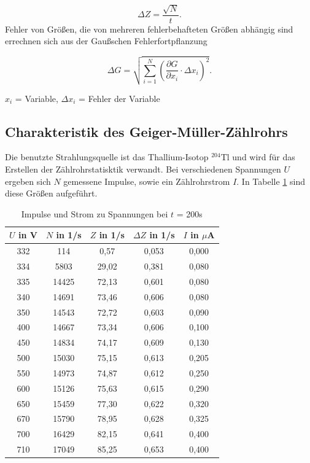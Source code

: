 \begin{equation}
 \Delta Z = \frac{\sqrt{N}}{t}.
\end{equation}
Fehler von Größen, die von mehreren fehlerbehafteten Größen abhängig sind errechnen sich aus der Gaußschen Fehlerfortpflanzung

\begin{formel}[H]
\begin{equation}
\Delta G = \sqrt{\sum_{i=1}^{N}\left( \frac{\partial G}{\partial x_i}\cdot \Delta x_i\right)^2}.
\label{eq_gauss}
\end{equation}
\caption*{\small{$x_i$ = Variable, $\Delta x_i$ = Fehler der Variable}}
\end{formel}

\subsection{Charakteristik des Geiger-Müller-Zählrohrs}
Die benutzte Strahlungsquelle ist das Thallium-Isotop $^{204}$Tl und wird für das Erstellen der Zählrohrstatisktik verwandt. Bei
verschiedenen Spannungen $U$ ergeben sich $N$ gemessene Impulse, sowie ein Zählrohrstrom $I$. In Tabelle \ref{tab_charakteristik} sind diese
Größen aufgeführt.

\begin{table}[H]
 \begin{tabular}{c|c|c|c|c}
 $U$ in V & $N$ in 1/s & $Z$ in 1/s & $\Delta Z$ in 1/s & $I$ in $\mu$A \\
 \hline
  332&	114 &0,57&	0,053&	0,000 \\
334&	5803 &29,02&	0,381&	0,080\\
335&	14425&	72,13&	0,601&	0,080\\
340&	14691&	73,46&	0,606&	0,080\\
350&	14543&	72,72&	0,603&	0,090\\
400&	14667&	73,34&	0,606&	0,100\\
450&	14834&	74,17&	0,609&	0,130\\
500&	15030&	75,15&	0,613&	0,205\\
550&	14973&	74,87&	0,612&	0,250\\
600&	15126&	75,63&	0,615&	0,290\\
650&	15459&	77,30&	0,622&	0,320\\
670&	15790&	78,95&	0,628&	0,325\\
700&	16429&	82,15&	0,641&	0,400\\
710&	17049&	85,25&	0,653 &	0,400\\
 \end{tabular}
\caption{Impulse und Strom zu Spannungen bei $t$ = 200s}
\label{tab_charakteristik}
 \end{table}

